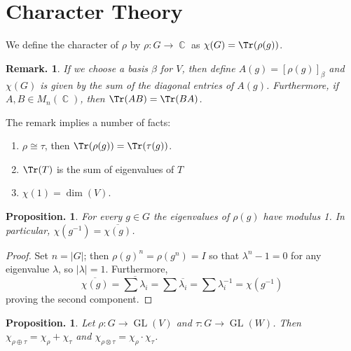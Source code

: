 \documentclass[11pt, a4paper]{memoir}
\DeclareMathOperator{\C}{{\mathbb{C}}}
\theoremstyle{change}
\newtheorem{proposition}[theorem]{Proposition.}
\theoremstyle{plain}
\theoremstyle{nonumberplain}
\newtheorem{remark}{Remark.}
\newtheorem{proof}{Proof}
\DeclareMathOperator{\GL}{GL}
\numberwithin{equation}{section}
\begin{document}
\section{Character Theory}
We define the character of $\rho$ by $\rho:G\to\C$ as $\chi(G)=\Tr(\rho(g))$.
\begin{remark}
    If we choose a basis $\beta$ for $V$, then define $A(g)=[\rho(g)]_\beta$ and $\chi(G)$ is given by the sum of the diagonal entries of $A(g)$.
    Furthermore, if $A,B\in M_n(\C)$, then $\Tr(AB)=\Tr(BA)$.
\end{remark}
The remark implies a number of facts:
\begin{enumerate}[nl,r]
    \item $\rho\cong\tau$, then $\Tr(\rho(g))=\Tr(\tau(g))$.
    \item $\Tr(T)$ is the sum of eigenvalues of $T$
    \item $\chi(1)=\dim(V)$.
\end{enumerate}
\begin{proposition}
    For every $g\in G$ the eigenvalues of $\rho(g)$ have modulus 1.
    In particular, $\chi(g^{-1})=\overline{\chi(g)}$.
\end{proposition}
\begin{proof}
    Set $n=|G|$; then $\rho(g)^n=\rho(g^n)=I$ so that $\lambda^n-1=0$ for any eigenvalue $\lambda$, so $|\lambda|=1$.
    Furthermore,
    \begin{equation*}
        \overline{\chi(g)}=\overline{\sum\lambda_i}=\sum\overline{\lambda_i}=\sum\lambda_i^{-1}=\chi(g^{-1})
    \end{equation*}
    proving the second component.
\end{proof}
\begin{proposition}
    Let $\rho:G\to\GL(V)$ and $\tau:G\to\GL(W)$.
    Then $\chi_{\rho\oplus\tau}=\chi_\rho+\chi_\tau$ and $\chi_{\rho\otimes\tau}=\chi_\rho\cdot\chi_\tau$.
\end{proposition}
\end{document}
